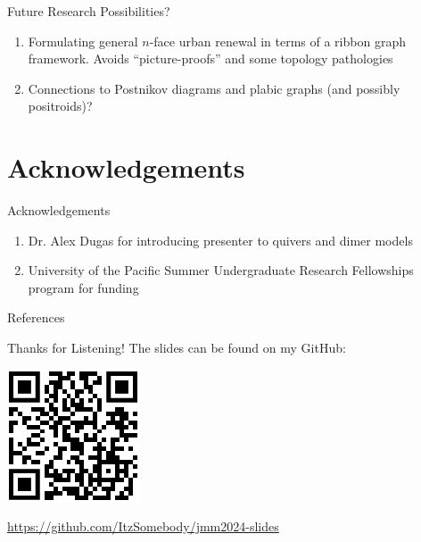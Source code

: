 \begin{frame}{Future Research Possibilities?}
\begin{enumerate}
\begin{center}
        \end{center}

        \vfill
        
        \item Formulating general $n$-face urban renewal in terms of a ribbon graph framework. Avoids ``picture-proofs'' and some topology pathologies \cite{bocklandtDimerABC2015}
        
        \vfill
        
        \item Connections to Postnikov diagrams and plabic graphs (and possibly positroids)?
    \end{enumerate}
\end{frame}


\section{Acknowledgements}

\begin{frame}{Acknowledgements}
    \begin{enumerate}
        \item Dr. Alex Dugas for introducing presenter to quivers and dimer models
        
        \vfill

        \item University of the Pacific Summer Undergraduate Research Fellowships program for funding
    \end{enumerate}
\end{frame}

\begin{frame}[allowframebreaks]{References}
    \printbibliography
\end{frame}


\begin{frame}{Thanks for Listening!}
    The slides can be found on my GitHub:
    \begin{center}
        \includegraphics[scale=1]{figures/github_qr.png}
        
        \url{https://github.com/ItzSomebody/jmm2024-slides}
    \end{center}
\end{frame}